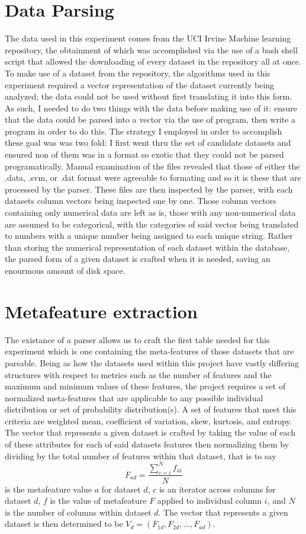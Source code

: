 \section{Data Parsing}
The data used in this experiment comes from the UCI Irvine Machine learning
repository, the obtainment of which was accomplished via the use of a bash
shell script that allowed the downloading of every dataset in the repository
all at once. To make use of a dataset from the repository, the algorithms used
in this experiment required a vector representation of the dataset currently
being analyzed; the data could not be used without first translating it into
this form. As such, I needed to do two things with the data before making use
of it: ensure that the data could be parsed into a vector via the use of program,
then write a program in order to do this. The strategy I employed in order to
accomplish these goal was was two fold: I first went thru the set of candidate
datasets and ensured non of them was in a format so exotic that they could not
be parsed programatically. Manual examination of the files revealed that those
of either the .data, .svm, or .dat format were agreeable to formating and so it
is these that are processed by the parser. These files are then inspected by the
parser, with each datasets column vectors being inspected one by one. Those
column vectors containing only numerical data are left as is, those with any
non-numerical data are assumed to be categorical, with the categories of said
vector being translated to numbers with a unique number being assigned to each
unique string. Rather than storing the numerical representation of each dataset
within the database, the parsed form of a given dataset is crafted when it is
needed, saving an enourmous amount of disk space.

\section{Metafeature extraction}
The existance of a parser allows us to craft the first table needed for this
experiment which is one containing the meta-features of those datasets that are
parsable. Being as how the datasets used within this project have vastly
differing structures with respect to metrics such as the number of features
and the maximum and minimum values of these features, the project requires a set
of normalized meta-features that are applicable to any possible individual
distribution or set of probability distribution(s). A set of features that meet
this criteria are weighted mean, coefficient of variation, skew, kurtosis, and
entropy. The vector that represents a given dataset is crafted by taking the
value of each of these attributes for each of said datasets features then
normalizing them by dividing by the total number of features within that dataset,
that is to say
$$F_{ad} = \frac{\sum_{c=i}^{N}f_{ai}}{N}$$
is the metafeature value $a$ for dataset $d$, $c$ is an iterator across columns
for dataset $d$, $f$ is the value of metafeature $F$ applied to individual
column $i$, and $N$ is the number of columns within dataset $d$. The vector that
represents a given dataset is then determined to be
$V_d = (F_{1d}, F_{2d},..., F_{ad})$.

